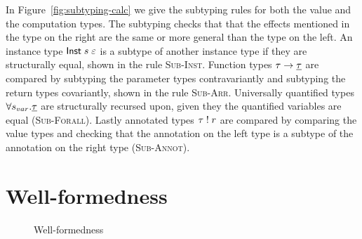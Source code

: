 {In Figure~\ref{fig:subtyping-calc} we give the subtyping rules for both the value and the computation types.
The subtyping checks that that the effects mentioned in the type on the right are the same or more general than the type on the left.
An instance type $\mathsf{Inst} \; s \; \varepsilon$ is a subtype of another instance type if they are structurally equal, shown in the rule \textsc{Sub-Inst}.
Function types $\tau \rightarrow \underline{\tau}$ are compared by subtyping the parameter types contravariantly and subtyping the return types covariantly, shown in the rule \textsc{Sub-Arr}.
Universally quantified types $\forall s_{var} . \underline{\tau}$ are structurally recursed upon, given they the quantified variables are equal (\textsc{Sub-Forall}).
Lastly annotated types $\tau \; ! \; r$ are compared by comparing the value types and checking that the annotation on the left type is a subtype of the annotation on the right type (\textsc{Sub-Annot}).

\section{Well-formedness}
\label{sec:wellformedness}

\begin{figure}[h]
\caption{Well-formedness}
\centering
{}
\end{figure}

}

